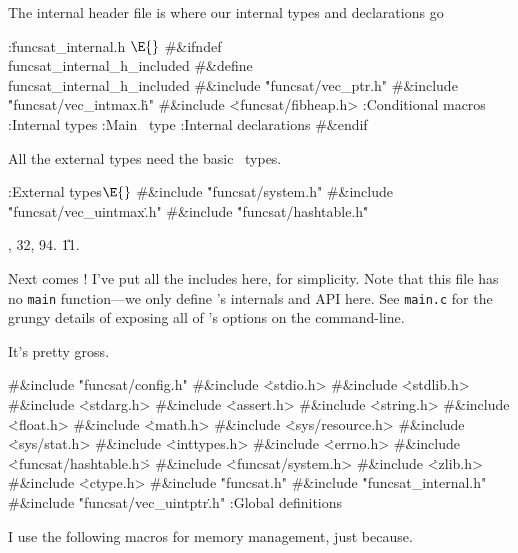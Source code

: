 The internal header file is where our internal types and declarations go

\Y\B\4:\.{funcsat\_internal.h }\X${}\E{}$\6
\8\#\&{ifndef} \\{funcsat\_internal\_h\_included}\6
\8\#\&{define} \\{funcsat\_internal\_h\_included}\6
\8\#\&{include} \.{"funcsat/vec\_ptr.h"}\6
\8\#\&{include} \.{"funcsat/vec\_intmax.}\)\.{h"}\6
\8\#\&{include} \.{<funcsat/fibheap.h>}\6
:Conditional macros\X\6
:Internal types\X\6
:Main \funcsat\ type\X\6
:Internal declarations\X\6
\8\#\&{endif}\par
\fi

 All the external types need the basic \funcsat\ types.

\Y\B\4:External types\X${}\E{}$\6
\8\#\&{include} \.{"funcsat/system.h"}\6
\8\#\&{include} \.{"funcsat/vec\_uintmax}\)\.{.h"}\6
\8\#\&{include} \.{"funcsat/hashtable.h}\)\.{"}\par
{}, 32, 94.
\U11.\fi

Next comes \funcsat! I've put all the includes here, for simplicity. Note
that
this file has no {\tt main} function---we only define \funcsat's internals and
API here. See {\tt main.c} for the grungy details of exposing all of \funcsat's
options on the command-line.

It's pretty gross.

\Y\B\8\#\&{include} \.{"funcsat/config.h"}\6
\8\#\&{include} \.{<stdio.h>}\6
\8\#\&{include} \.{<stdlib.h>}\6
\8\#\&{include} \.{<stdarg.h>}\6
\8\#\&{include} \.{<assert.h>}\6
\8\#\&{include} \.{<string.h>}\6
\8\#\&{include} \.{<float.h>}\6
\8\#\&{include} \.{<math.h>}\6
\8\#\&{include} \.{<sys/resource.h>}\6
\8\#\&{include} \.{<sys/stat.h>}\6
\8\#\&{include} \.{<inttypes.h>}\6
\8\#\&{include} \.{<errno.h>}\6
\8\#\&{include} \.{<funcsat/hashtable.h}\)\.{>}\6
\8\#\&{include} \.{<funcsat/system.h>}\6
\8\#\&{include} \.{<zlib.h>}\6
\8\#\&{include} \.{<ctype.h>}\6
\8\#\&{include} \.{"funcsat.h"}\6
\8\#\&{include} \.{"funcsat\_internal.h"}\6
\8\#\&{include} \.{"funcsat/vec\_uintptr}\)\.{.h"}\6
:Global definitions\X\par
\fi

I use the following macros for memory management, just because.

